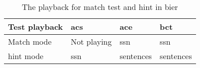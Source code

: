 \begin{table}[H]
\centering
\caption{The playback for match test and \gls{hint} in \gls{bier}}
\begin{tabular}{l|lll}
Test playback   & \gls{acs}   & \gls{ace} & \gls{bct} \\ \hline
Match mode      & Not playing & \gls{ssn} & \gls{ssn} \\
\gls{hint} mode & \gls{ssn}   & sentences & sentences
\end{tabular}
\label{sec:playback_bier}
\end{table}


















